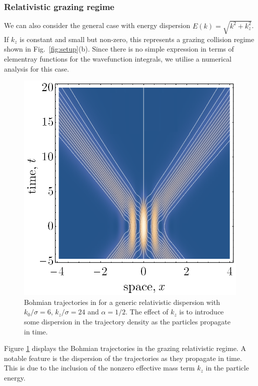 \documentclass[12pt,prx,
,nofootinbib
,floatfix
,superscriptaddress
]{revtex4-2}
\begin{document}
\subsubsection{Relativistic grazing regime} 
We can also consider the general case with energy dispersion $E(k) = \sqrt{k^2 + k_z^2}$. If $k_z$ is constant and small but non-zero, this represents a grazing collision regime shown in Fig.\ \ref{fig:setup}(b). Since there is no simple expression in terms of elementray functions for the wavefunction integrals, we utilise a numerical analysis for this case. 
\begin{figure}[htp]
    \centering
    \includegraphics[width=0.6\linewidth]{Fig4subrelativistic.png}
    \caption{Bohmian trajectories in for a generic relativistic dispersion with $k_0/\sigma = 6$, $k_z/\sigma = 24$ and $\alpha = 1/2$. The effect of $k_z$ is to introduce some dispersion in the trajectory density as the particles propagate in time. }
    \label{fig:subrelativistic}
\end{figure}
Figure \ref{fig:subrelativistic} displays the Bohmian trajectories in the grazing relativistic regime. A notable feature is the dispersion of the trajectories as they propagate in time. This is due to the inclusion of the nonzero effective mass term $k_z$ in the particle energy. 
\end{document}

